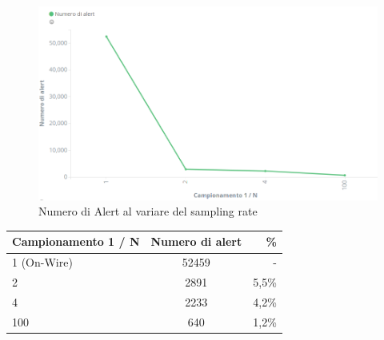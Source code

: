 \documentclass[12pt,a4paper,openright,twoside]{report}
\begin{document}
\begin{figure}[h!]
\begin{center}                          %
  \includegraphics[width=\textwidth]{images/DARPA-sampling-rate.png}
  \caption{Numero di Alert al variare del sampling rate}
  \label{}
\end{center}
\end{figure}
\begin{center}
  \begin{tabular}{| l | c | r |}
    \hline
    {\bf Campionamento 1 / N }& {\bf Numero di alert } & {\bf \% }\\ \hline
    1 (On-Wire) & 52459 & - \\ \hline
    2 & 2891 & 5,5\% \\ \hline
    4 & 2233 & 4,2\% \\ \hline
    100 & 640 & 1,2\% \\ \hline
  \end{tabular}
\end{center}
\end{document}
